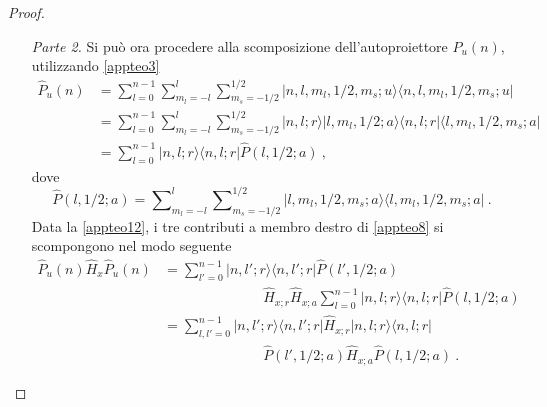 \documentclass[12pt,a4paper]{report}
\numberwithin{equation}{section}
\numberwithin{section}{chapter}
\begin{document}
\begin{proof}
\begin{enumerate}[leftmargin=0pt, itemindent=2.67\parindent]
\begin{align}
		&{\widehat{H}}_{so;r} = \frac{Ze^2}{2m^2c^2}\frac{1}{\widehat{r}^3}~,\label{appteo13:second}\\
		&{\widehat{H}}_{D;r} = \frac{\hslash^2Ze^2}{2m^2c^2}\frac{\delta(\widehat{r})}{\widehat{r}^2}~,\label{appteo13:third}\\
		&{\widehat{H}}_{mv;a} = \widehat{1}~,\label{appteo13:fourth}\\
		&{\widehat{H}}_{so;a} = \widehat{\boldsymbol{l}} \cdot \widehat{\boldsymbol{s}}~,\label{appteo13:fifth}\\
		&{\widehat{H}}_{D;a} = \widehat{1}~,\label{appteo13:sixth}
		\end{align}
		dove si nota facilmente che la sola componente angolare non banale \`e quella spin-orbita.
		\item[\textit{Parte 2.}] Si pu\`o ora procedere alla scomposizione dell'autoproiettore $\widehat{P}_u(n)$, utilizzando \eqref{appteo3}		
		\begin{align}
		\label{appteo14}
		\widehat{P}_u(n) &=\sum\nolimits_{l=0}^{n-1}\sum\nolimits_{m_l=-l}^l\sum\nolimits_{m_s=-1/2}^{1/2}|n,l,m_l,1/2,m_s;u\rangle\langle n,l,m_l,1/2,m_s;u|\\
		&=\sum\nolimits_{l=0}^{n-1}\sum\nolimits_{m_l=-l}^l\sum\nolimits_{m_s=-1/2}^{1/2}|n,l;r\rangle|l,m_l,1/2;a\rangle\langle n,l;r|\langle l,m_l,1/2,m_s;a|\nonumber\\
		&=\sum\nolimits_{l=0}^{n-1}|n,l;r\rangle\langle n,l;r|\widehat{P}(l,1/2;a)~,\nonumber
		\end{align}
		dove
		\begin{equation}
		\label{appteo15}
		\widehat{P}(l,1/2;a) = \sum\nolimits_{m_l=-l}^l\sum\nolimits_{m_s=-1/2}^{1/2}|l,m_l,1/2,m_s;a\rangle\langle l,m_l,1/2,m_s;a|~.
		\end{equation}
		Data la \eqref{appteo12}, i tre contributi a membro destro di \eqref{appteo8} si scompongono nel modo seguente
		\begin{align}
		\label{appteo16}
		\widehat{P}_u(n)\widehat{H}_x\widehat{P}_u(n) &= \sum\nolimits_{l'=0}^{n-1}|n,l';r\rangle\langle n,l';r|\widehat{P}(l',1/2;a)\\
		&\hspace{3cm}\widehat{H}_{x;r}\widehat{H}_{x;a}\sum\nolimits_{l=0}^{n-1}|n,l;r\rangle\langle n,l;r|\widehat{P}(l,1/2;a)\nonumber\\
		&=\sum\nolimits_{l,l'= 0}^{n-1}|n,l';r\rangle\langle n,l';r|\widehat{H}_{x;r}|n,l;r\rangle\langle n,l;r|\nonumber\\
		&\hspace{3cm}\widehat{P}(l',1/2;a)\widehat{H}_{x;a}\widehat{P}(l,1/2;a)~.\nonumber

\end{align}
\end{enumerate}
\end{proof}
\end{document}
